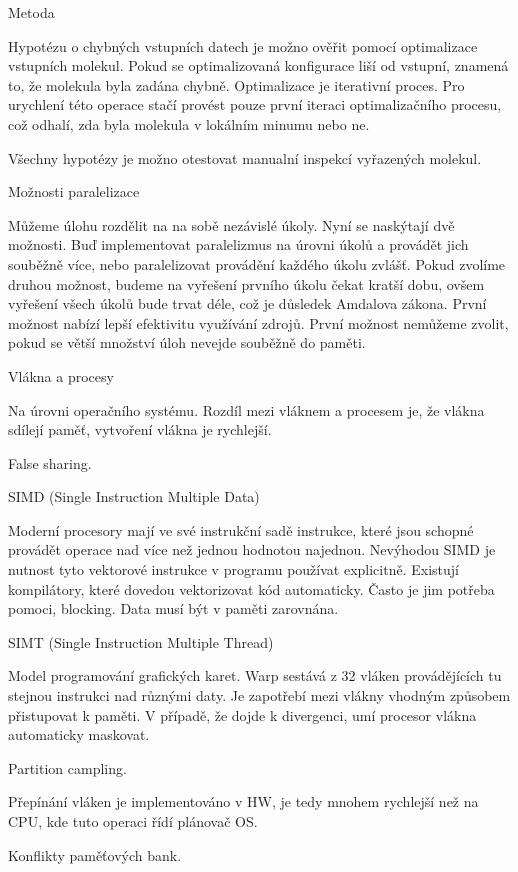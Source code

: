 \documentclass[10pt,draft,oneside]{fithesis2}
\begin{document}
Metoda

Hypotézu o chybných vstupních datech je možno ověřit pomocí optimalizace vstupních molekul. Pokud se optimalizovaná konfigurace liší od vstupní, znamená to, že molekula byla zadána chybně. Optimalizace je iterativní proces. Pro urychlení této operace stačí provést pouze první iteraci optimalizačního procesu, což odhalí, zda byla molekula v lokálním minumu nebo ne.

Všechny hypotézy je možno otestovat manualní inspekcí vyřazených molekul.

Možnosti paralelizace

Můžeme úlohu rozdělit na na sobě nezávislé úkoly. Nyní se naskýtají dvě možnosti. Buď implementovat paralelizmus na úrovni úkolů a provádět jich souběžně více, nebo paralelizovat provádění každého úkolu zvlášť. Pokud zvolíme druhou možnost, budeme na vyřešení prvního úkolu čekat kratší dobu, ovšem vyřešení všech úkolů bude trvat déle, což je důsledek Amdalova zákona. První možnost nabízí lepší efektivitu využívání zdrojů. První možnost nemůžeme zvolit, pokud se větší množství úloh nevejde souběžně do paměti.

Vlákna a procesy

Na úrovni operačního systému. Rozdíl mezi vláknem a procesem je, že vlákna sdílejí paměť, vytvoření vlákna je rychlejší.

False sharing.

SIMD (Single Instruction Multiple Data)

Moderní procesory mají ve své instrukční sadě instrukce, které jsou schopné provádět operace nad více než jednou hodnotou najednou. Nevýhodou SIMD je nutnost tyto vektorové instrukce v programu používat explicitně. Existují kompilátory, které dovedou vektorizovat kód automaticky. Často je jim potřeba pomoci, blocking. Data musí být v paměti zarovnána.

SIMT (Single Instruction Multiple Thread)

Model programování grafických karet. Warp sestává z 32 vláken provádějících tu stejnou instrukci nad různými daty. Je zapotřebí mezi vlákny vhodným způsobem přistupovat k paměti. V případě, že dojde k divergenci, umí procesor vlákna automaticky maskovat.

Partition campling.

Přepínání vláken je implementováno v HW, je tedy mnohem rychlejší než na CPU, kde tuto operaci řídí plánovač OS.

Konflikty paměťových bank.
\end{document}
